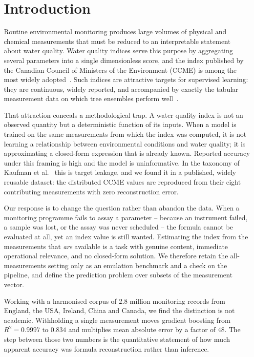 \section{Introduction}

Routine environmental monitoring produces large volumes of physical and chemical
measurements that must be reduced to an interpretable statement about water quality.
Water quality indices serve this purpose by aggregating several parameters into a single
dimensionless score, and the index published by the Canadian Council of Ministers of the
Environment (CCME) is among the most widely adopted~\cite{ccme2001wqi}. Such indices are
attractive targets for supervised learning: they are continuous, widely reported, and
accompanied by exactly the tabular measurement data on which tree ensembles perform
well~\cite{breiman2001randomforests, chen2016xgboost}.

That attraction conceals a methodological trap. A water quality index is not an observed
quantity but a deterministic function of its inputs. When a model is trained on the same
measurements from which the index was computed, it is not learning a relationship between
environmental conditions and water quality; it is approximating a closed-form expression
that is already known. Reported accuracy under this framing is high and the model is
uninformative. In the taxonomy of Kaufman et al.~\cite{kaufman2012leakage} this is target
leakage, and we found it in a published, widely reusable dataset: the distributed CCME
values are reproduced from their eight contributing measurements with zero reconstruction
error.

Our response is to change the question rather than abandon the data. When a monitoring
programme fails to assay a parameter -- because an instrument failed, a sample was lost,
or the assay was never scheduled -- the formula cannot be evaluated at all, yet an index
value is still wanted. Estimating the index from the measurements that \emph{are}
available is a task with genuine content, immediate operational relevance, and no
closed-form solution. We therefore retain the all-measurements setting only as an
emulation benchmark and a check on the pipeline, and define the prediction problem over
subsets of the measurement vector.

Working with a harmonised corpus of 2.8 million monitoring records from England, the USA,
Ireland, China and Canada, we find the distinction is not academic. Withholding a single
measurement moves gradient boosting from $R^2 = 0.9997$ to $0.834$ and multiplies mean
absolute error by a factor of 48. The step between those two numbers is the quantitative
statement of how much apparent accuracy was formula reconstruction rather than inference.

